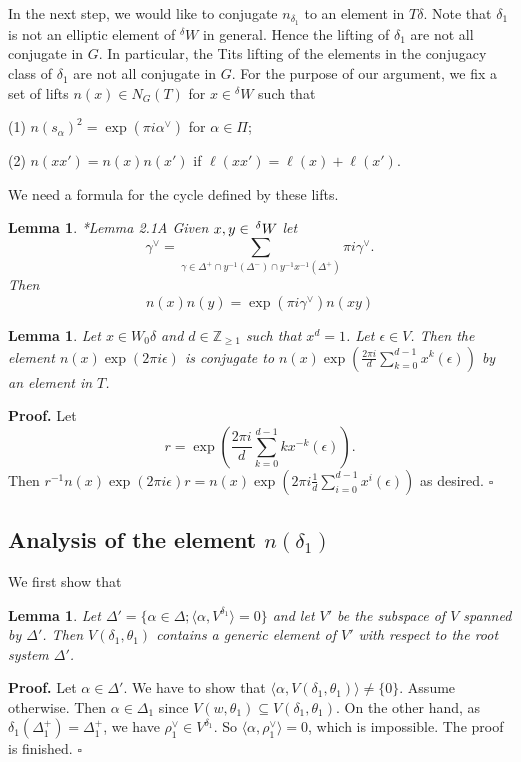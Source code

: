 \documentclass[10pt,leqno]{article}
\newtheorem{lemma}[equation]{Lemma}
\newcommand{\qed}{\hfill $\square$ \medskip}
\newenvironment{proof}[1][Proof]{\noindent\textbf{#1.} }{\qed}
\renewcommand{\a}{\mathfrak a}
\newcommand{\g}{\mathfrak g}
\newcommand{\e}{\text{e}}
\newcommand{\Wext}{\negthinspace\negthinspace\phantom{a}^\delta W}
\def\ge{\geqslant}
\def\a{\alpha}
\def\g{\gamma}
\def\d{\delta}
\def\D{\Delta}
\def\e{\epsilon}
\def\th{\theta}
\def\i{^{-1}}
\begin{document}
In the next step, we would like to conjugate $n_{\d_1}$ to an element in $T \d$. Note that $\d_1$ is not an elliptic element of ${}^\d W$ in general.
Hence the lifting of $\d_1$ are not all conjugate in $G$. In particular, the Tits lifting of the elements in the conjugacy class of $\d_1$ are not all conjugate in $G$. For the purpose of our argument, we fix a set of lifts $n(x) \in N_G(T)$ for $x \in {}^\d W$ such that

(1) $n(s_\a)^2=\exp(\pi i \a^\vee)$ for $\a \in \Pi$;

(2) $n(x x') = n(x) n(x')$ if $\ell(x x') = \ell(x) + \ell(x')$.

We need a formula for the cycle defined by these lifts.

\begin{lemma} \label{factor}{\cite{ls}*{Lemma 2.1A}}
Given $x,y\in \Wext$ let
$$
\gamma^\vee=\sum_{\g \in \D^+ \cap y \i(\D^-) \cap y \i x \i (\D^+)} \pi i \g^\vee.
$$
Then
$$
n(x)n(y)=\exp(\pi i\gamma^\vee)n(xy)
$$
\end{lemma}


\begin{lemma} \label{average}
	Let $x \in W_0 \d$ and  $d \in \mathbb Z_{\ge 1}$ such that $x^d=1$. Let $\e \in V$. Then the element $n(x) \exp(2 \pi i \e)$ is conjugate to $n(x) \exp(\frac{2 \pi i}{d}\sum_{k=0}^{d-1} x^k(\e))$ by an element in $T$.
\end{lemma}
\begin{proof}
	Let $$r=\exp(\frac{2\pi i }{d}\sum_{k=0}^{d-1} k x^{-k}(\e)).$$ Then $r^{-1} n(x) \exp(2 \pi i \e) r = n(x) \exp(2\pi i\frac{1}{d}\sum_{i=0}^{d-1} x^i(\e))$ as desired.
\end{proof}

\subsection{Analysis of the element $n(\d_1)$}

We first show that

\begin{lemma}
	Let $\D'=\{\a \in \D; \langle\a, V^{\d_1}\rangle=0\}$ and let $V'$ be the subspace of $V$ spanned by $\D'$. Then $V(\d_1, \th_1)$ contains a generic element of $V'$ with respect to the root system $\D'$.
\end{lemma}
\begin{proof}
	Let $\a \in \D'$. We have to show that $\langle\a, V(\d_1, \th_1)\rangle \neq \{0\}$. Assume otherwise. Then $\a \in \D_1$ since $V(w, \th_1) \subseteq V(\d_1, \th_1)$. On the other hand, as $\d_1(\D_1^+) = \D_1^+$, we have $\rho_1^\vee \in V^{\d_1}$. So $\langle\a, \rho_1^\vee \rangle = 0$, which is impossible. The proof is finished.
\end{proof}
\end{document}
